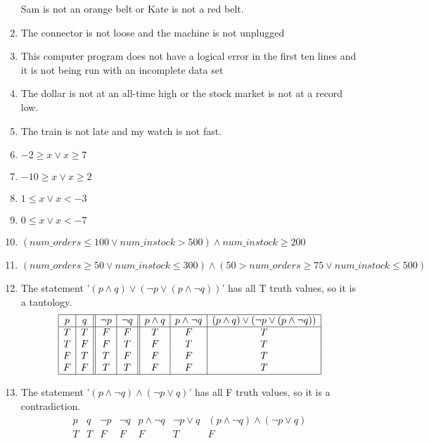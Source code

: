 \documentclass{article}
\begin{document}
\begin{enumerate}[label=\textbf{\arabic*.}]
Sam is not an orange belt or Kate is not a red belt.
\item %
The connector is not loose and the machine is not unplugged
\item %
This computer program does not have a logical error in the first ten lines and it is not being run with an incomplete data set
\item %
The dollar is not at an all-time high or the stock market is not at a record low.
\item %
The train is not late and my watch is not fast.
\item %
$-2 \geq x \lor x \geq 7$
\item %
$-10 \geq x \lor x \geq 2$
\item %
$1 \leq x \lor x < -3$
\item %
$0 \leq x \lor x < -7$
\item %
$(num\_orders \leq 100 \lor num\_instock > 500) \land num\_instock \geq 200$
\item %
$(num\_orders \geq 50 \lor num\_instock \leq 300) \land (50 > num\_orders \geq 75 \lor num\_instock \leq 500)$
\item %
The statement '$(p \land q) \lor (\neg p \lor (p \land \neg q))$' has all T truth values, so it is a tautology.
\[
\begin{array}{|c|c||c|c||c|c|c|}
\hline
p & q & \neg p & \neg q & p \land q & p \land \neg q & (p \land q) \lor (\neg p \lor (p \land \neg q))\\
\hline
T & T & F & F & T & F & T \\
T & F & F & T & F & T & T \\
F & T & T & F & F & F & T \\
F & F & T & T & F & F & T \\
\hline 
\end{array}
\]
\item %
The statement '$(p \land \neg q) \land (\neg p \lor q)$' has all F truth values, so it is a contradiction.
\[
\begin{array}{|c|c||c|c||c|c|c|}
\hline
p & q & \neg p & \neg q & p \land \neg q & \neg p \lor q &(p \land \neg q) \land (\neg p \lor q)\\
\hline
T & T & F & F & F & T & F \\

\end{array}\]
\end{enumerate}
\end{document}
